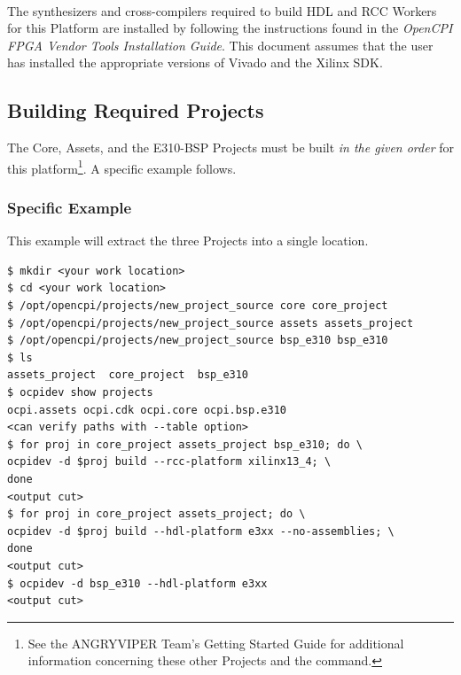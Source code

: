 \begin{flushleft}
\begin{center}
\end{center}
\ \bigskip %

The synthesizers and cross-compilers required to build HDL and RCC Workers for this Platform are installed by following the instructions found in the \textit{OpenCPI FPGA Vendor Tools Installation Guide}. This document assumes that the user has installed the appropriate versions of Vivado and the Xilinx SDK.\\ \bigskip

\subsection{Building Required Projects}
The Core, Assets, and the E310-BSP Projects must be built \textit{in the given order} for this platform\footnote{See the ANGRYVIPER Team's Getting Started Guide for additional information concerning these other Projects and the  command.}. A specific example follows. \bigskip

\subsubsection*{Specific Example}
This example will extract the three Projects into a single location.
\begin{lstlisting}[showspaces=false]
$ mkdir <your work location>
$ cd <your work location>
$ /opt/opencpi/projects/new_project_source core core_project
$ /opt/opencpi/projects/new_project_source assets assets_project
$ /opt/opencpi/projects/new_project_source bsp_e310 bsp_e310
$ ls
assets_project  core_project  bsp_e310
$ ocpidev show projects
ocpi.assets ocpi.cdk ocpi.core ocpi.bsp.e310
<can verify paths with --table option>
$ for proj in core_project assets_project bsp_e310; do \
ocpidev -d $proj build --rcc-platform xilinx13_4; \
done
<output cut>
$ for proj in core_project assets_project; do \
ocpidev -d $proj build --hdl-platform e3xx --no-assemblies; \
done
<output cut>
$ ocpidev -d bsp_e310 --hdl-platform e3xx
<output cut>
\end{lstlisting}


\end{flushleft}
